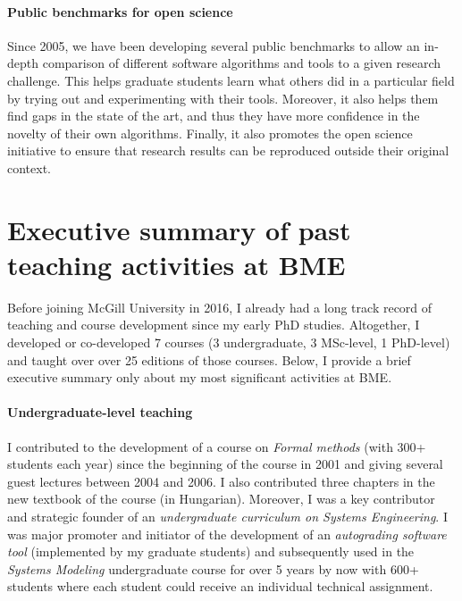 \documentclass[a4paper,11pt]{report}
\begin{document}
\paragraph{Public benchmarks for open science}
Since 2005, we have been developing several public benchmarks to allow an in-depth comparison of different software algorithms and tools to a given research challenge. This helps graduate students learn what others did in a particular field by trying out and experimenting with their tools. Moreover, it also helps them find gaps in the state of the art, and thus they have more confidence in the novelty of their own algorithms. Finally, it also promotes the open science initiative to ensure that research results can be reproduced outside their original context.






\section{Executive summary of past teaching activities at BME}

Before joining McGill University in 2016, I already had a long track record of teaching and course development since my early PhD studies. Altogether, I developed or co-developed 7 courses (3 undergraduate, 3 MSc-level, 1 PhD-level) and taught  over over 25 editions of those courses. Below, I provide a brief executive summary only about my most significant activities at BME. 

\paragraph{Undergraduate-level teaching}
I contributed to the development of a course on \emph{Formal methods} (with 300+ students each year) since the beginning of the course in 2001 and giving several guest lectures between 2004 and 2006. I also contributed three chapters in the new textbook of the course (in Hungarian).  Moreover, I was a key contributor and strategic founder of an \emph{undergraduate curriculum on Systems Engineering}.  I was major promoter and initiator of the development of an \emph{autograding software tool} (implemented by my graduate students) and subsequently used in the \emph{Systems Modeling} undergraduate course for over 5 years by now with 600+ students where each student could receive an individual technical assignment. 
\end{document}
